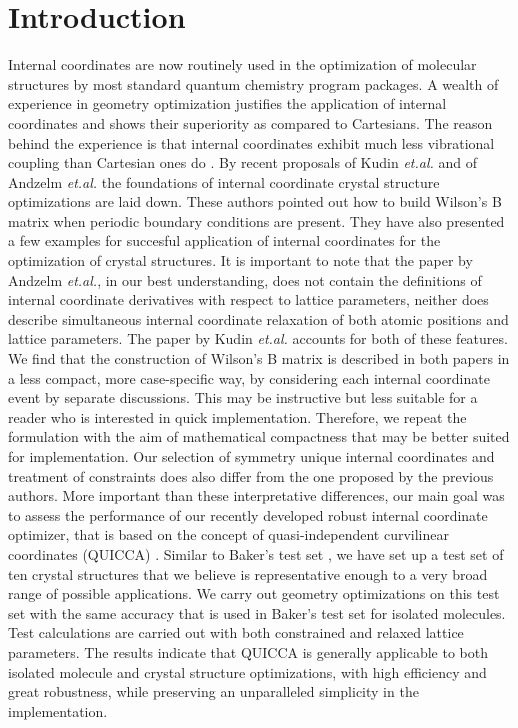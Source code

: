 \documentclass[prl,aps,preprint,superbib,12pt]{revtex4}
\begin{document}
\section{Introduction}
Internal coordinates are now routinely used in the optimization of 
molecular structures by most standard quantum chemistry program 
packages. A wealth of experience in geometry optimization justifies
the application of internal coordinates and shows their
superiority as compared to Cartesians. The reason behind the
experience is that internal coordinates exhibit much less
vibrational coupling than Cartesian ones do 
\cite{PPulay69,GFogarasi79,GFogarasi92,PPulay77}.
By recent proposals of Kudin {\it et.al.} \cite{KKudin01} and of
Andzelm {\it et.al.} \cite{JAndzelm01} the foundations of 
internal coordinate
crystal structure optimizations are laid down. These authors
pointed out how to build Wilson's B matrix \cite{EWilson55} 
when periodic boundary conditions are present. They have also
presented a few examples for succesful application of internal 
coordinates for the optimization of crystal structures. It is 
important to note that the paper by Andzelm {\it et.al.}, in our best
understanding, does not contain the definitions of 
internal coordinate derivatives with respect to lattice parameters,
neither does describe simultaneous internal coordinate relaxation
of both atomic positions and lattice parameters.
The paper by Kudin {\it et.al.} accounts for both of these
features. We find that the construction of Wilson's B matrix
is described in both papers in a less compact, more case-specific 
way, by considering each internal coordinate event by separate 
discussions. This may be instructive but less suitable for
a reader who is interested in quick implementation.
Therefore, we repeat the formulation with the aim of mathematical
compactness that may be better suited for implementation.
Our selection of symmetry unique internal coordinates and treatment
of constraints does also differ from the one proposed by the previous
authors.
More important than these interpretative differences,
our main goal was to
assess the performance of our recently developed robust internal
coordinate optimizer, that is based on the concept of
quasi-independent curvilinear coordinates (QUICCA) \cite{KNemeth04}.
Similar to Baker's test set \cite{JBaker93}, we have set up 
a test set of ten crystal structures that we believe is representative
enough to a very broad range of possible applications. We carry out
geometry optimizations on this test set with the same accuracy
that is used in Baker's test set for isolated molecules.
Test calculations are carried out with both constrained and
relaxed lattice parameters. The results indicate that
QUICCA is generally applicable to both isolated molecule and crystal
structure optimizations, with high efficiency and great robustness,
while preserving an unparalleled simplicity in the implementation.
\end{document}
